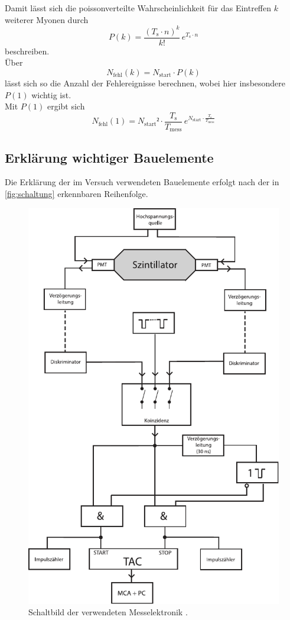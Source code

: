 Damit lässt sich die poissonverteilte Wahrscheinlichkeit für das Eintreffen $k$ weiterer Myonen durch
\begin{equation*}
    P(k) = \frac{(T_\text{s} \cdot n)^k}{k!} \, e^{T_\text{s} \cdot n}
\end{equation*}
beschreiben. \\

Über
\begin{equation*}
    N_\text{fehl} (k) = N_\text{start} \cdot P(k)
\end{equation*}
lässt sich so die Anzahl der Fehlereignisse berechnen, wobei hier insbesondere $P(1)$ wichtig ist. \\
Mit $P(1)$ ergibt sich
\begin{equation}
    N_\text{fehl} (1) =  {N_\text{start}}²  \cdot \frac{T_\text{s}}{T_\text{mess}} \, e^{{ N_\text{start}} \cdot \frac{T_\text{s}}{T_\text{mess}}}
    \label{eq:theo_unter}
\end{equation}


\newpage

\subsection{Erklärung wichtiger Bauelemente}

Die Erklärung der im Versuch verwendeten Bauelemente erfolgt nach der in \autoref{fig:schaltung} erkennbaren Reihenfolge.

\begin{figure}[H]
    \centering
    \includegraphics[width=.6\textwidth]{figures/V01.pdf}
    \caption{Schaltbild der verwendeten Messelektronik \cite{ap03}.}
    \label{fig:schaltung}
\end{figure}


